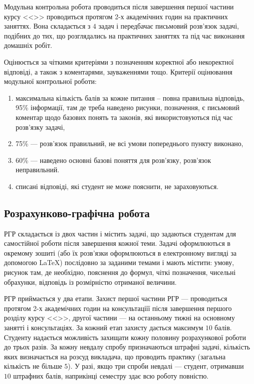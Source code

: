 \documentclass{Syllabus}
\begin{document}

Модульна контрольна робота проводиться після завершення першої частини курсу <<\discipline>> проводиться протягом 2-х академічних годин на практичних заняттях. Вона складається з $4$ задач і передбачає письмовий розв’язок задачі, подібних до тих, що розглядались на практичних заняттях та під час виконання домашніх робіт.

Оцінюється за чіткими критеріями з позначенням коректної або некоректної відповіді, а також з коментарями, зауваженнями тощо. Критерії оцінювання модульної контрольної роботи:
\begin{enumerate}[label=$\bullet$]
	\item максимальна кількість балів за кожне питання – повна правильна відповідь, 95\% інформації, там де треба наведено рисунки, позначення, є письмовий коментар щодо базових понять та законів, які використовуються під час розв’язку задачі,
	\item 75\%  --- розв’язок правильний, не всі умови попереднього пункту виконано,
	\item 60\%  --- наведено основні базові поняття для розв’язку, розв’язок неправильний.
	\item списані відповіді, які студент не може пояснити, не зараховуються.
\end{enumerate}


\subsection*{Розрахунково-графічна робота}


РГР складається із двох частин і містить задачі, що задаються студентам для самостійної роботи після завершення кожної теми. Задачі оформлюються в окремому зошиті (або їх розв'язки оформлюються в електронному вигляді за допомогою \LaTeX{}) послідовно за заданими темами і мають містити: умову, рисунок там, де необхідно, пояснення до формул, чіткі позначення, чисельні обрахунки, відповідь із розмірністю отриманої величини.

РГР приймається у два етапи. Захист першої частини РГР --- проводиться протягом 2-х академічних годин на консультаціїї після завершення першого розділу курсу <<\discipline>>, другої частини --- на останньому тижні на основному занятті і консультаціях. За кожний етап захисту дається максимум $10$ балів. Студенту надається можливість захищати кожну половину розрахункової роботи до трьох разів. За кожну невдалу спробу призначаються штрафні задачі, кількість яких визначається на розсуд викладача, що проводить практику (загальна кількість не більше $5$). У разі, якщо три спроби невдалі --- студент, отримавши $10$ штрафних балів, наприкінці семестру здає всю роботу повністю.
\end{document}
